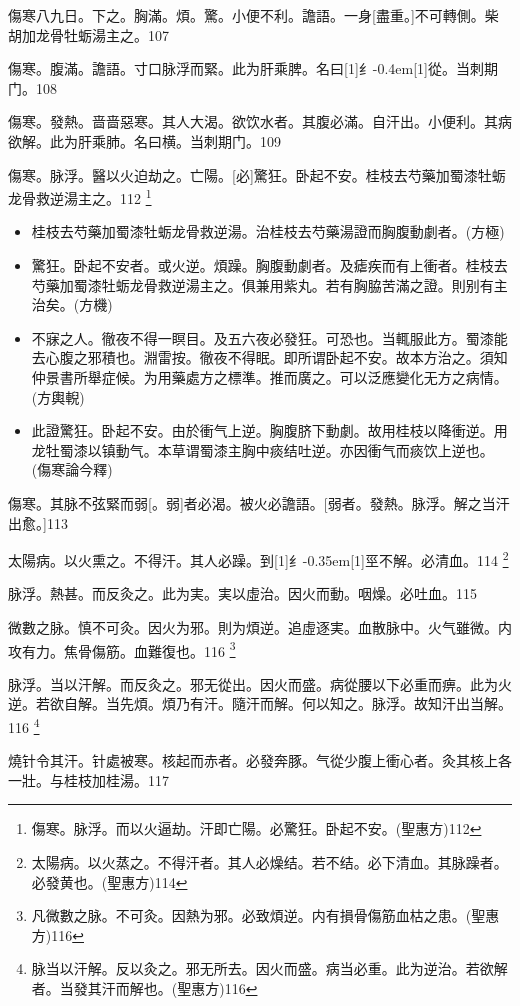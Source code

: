 \documentclass[oneside,b4paper]{ctexbook}
\begin{document}
\begin{flushleft}
傷寒八九日。下之。胸滿。煩。驚。小便不利。譫語。一身[盡重。]不可轉側。柴胡加龙骨牡蛎湯主之。107

傷寒。腹滿。譫語。寸口脉浮而緊。此为肝乘脾。名曰{\hbox{\scalebox{0.6}[1]{纟}\kern-0.4em\scalebox{0.7}[1]{從}}}。当刺期门。108

傷寒。發熱。啬啬惡寒。其人大渴。欲饮水者。其腹必滿。自汗出。小便利。其病欲解。此为肝乘肺。名曰横。当刺期门。109

傷寒。脉浮。醫以火迫劫之。亡陽。[必]驚狂。卧起不安。桂枝去芍藥加蜀漆牡蛎龙骨救逆湯主之。112
\footnote{傷寒。脉浮。而以火逼劫。汗即亡陽。必驚狂。卧起不安。(聖惠方)112}
\begin{itemize}
\item 桂枝去芍藥加蜀漆牡蛎龙骨救逆湯。治桂枝去芍藥湯證而胸腹動劇者。(方極)
\item 驚狂。卧起不安者。或火逆。煩躁。胸腹動劇者。及瘧疾而有上衝者。桂枝去芍藥加蜀漆牡蛎龙骨救逆湯主之。俱兼用紫丸。若有胸脇苦滿之證。則别有主治矣。(方機)
\item 不寐之人。徹夜不得一瞑目。及五六夜必發狂。可恐也。当輒服此方。蜀漆能去心腹之邪積也。淵雷按。徹夜不得眠。即所谓卧起不安。故本方治之。須知仲景書所舉症候。为用藥處方之標準。推而廣之。可以泛應變化无方之病情。(方輿輗)
\item 此證驚狂。卧起不安。由於衝气上逆。胸腹脐下動劇。故用桂枝以降衝逆。用龙牡蜀漆以镇動气。本草谓蜀漆主胸中痰结吐逆。亦因衝气而痰饮上逆也。(傷寒論今釋)
\end{itemize}

傷寒。其脉不弦緊而弱[。弱]者必渴。被火必譫語。[弱者。發熱。脉浮。解之当汗出愈。]113

太陽病。以火熏之。不得汗。其人必躁。到{\hbox{\scalebox{0.68}[1]{纟}\kern-0.35em\scalebox{0.64}[1]{巠}}}不解。必清血。114
\footnote{太陽病。以火蒸之。不得汗者。其人必燥结。若不结。必下清血。其脉躁者。必發黄也。(聖惠方)114}

脉浮。熱甚。而反灸之。此为実。実以虛治。因火而動。咽燥。必吐血。115　

微數之脉。慎不可灸。因火为邪。則为煩逆。追虛逐実。血散脉中。火气雖微。内攻有力。焦骨傷筋。血難復也。116
\footnote{凡微數之脉。不可灸。因熱为邪。必致煩逆。内有損骨傷筋血枯之患。(聖惠方)116}

脉浮。当以汗解。而反灸之。邪无從出。因火而盛。病從腰以下必重而痹。此为火逆。若欲自解。当先煩。煩乃有汗。隨汗而解。何以知之。脉浮。故知汗出当解。116
\footnote{脉当以汗解。反以灸之。邪无所去。因火而盛。病当必重。此为逆治。若欲解者。当發其汗而解也。(聖惠方)116}

燒针令其汗。针處被寒。核起而赤者。必發奔豚。气從少腹上衝心者。灸其核上各一壯。与桂枝加桂湯。117


\end{flushleft}
\end{document}

